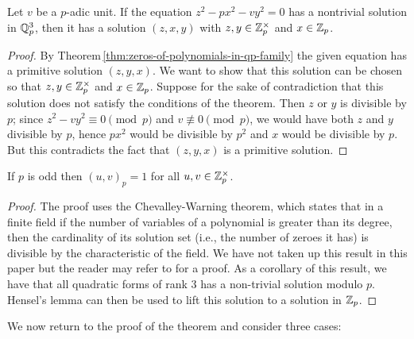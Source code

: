 \begin{lemmax}\label{lem:serre-sol-zp}
    {\normalfont\cite[p.~21]{serre2012course}} Let \(v\) be a \(p\)-adic unit.
    If the equation \(z^2 - px^2 - vy^2 = 0\) has a nontrivial solution in
    \(\mathbb{Q}_p^3\), then it has a solution \((z, x, y)\) with \(z, y \in
    \mathbb{Z}_p^{\times}\) and \(x \in \mathbb{Z}_p\).
\end{lemmax}

\begin{proof}
    By Theorem\,\ref{thm:zeros-of-polynomials-in-qp-family} the given equation
    has a primitive solution \((z, y, x)\). We want to show that this solution
    can be chosen so that \(z, y \in \mathbb{Z}_p^{\times}\) and \(x \in \mathbb{Z}_p\). Suppose
    for the sake of contradiction that this solution does not satisfy the
    conditions of the theorem. Then \(z\) or \(y\) is divisible by \(p\); since
    \(z^2 - vy^2 \equiv 0 \pmod{p}\) and \(v \not\equiv 0 \pmod{p}\), we would
    have both \(z\) and \(y\) divisible by \(p\), hence \(px^2\) would be
    divisible by \(p^2\) and \(x\) would be divisible by \(p\). But this
    contradicts the fact that \((z, y, x)\) is a primitive solution.
\end{proof}

\begin{lemmax}\label{lem:hilbert-odd-units}
    {\normalfont\cite[Lemma~10.5]{sutherland2013introduction10}} If \(p\) is odd
    then \((u, v)_p = 1\) for all \(u, v \in \mathbb{Z}_p^{\times}\).
\end{lemmax}

\begin{proof}
    The proof uses the Chevalley-Warning theorem, which states that in a finite
    field if the number of variables of a polynomial is greater than its degree,
    then the cardinality of its solution set (i.e., the number of zeroes it has)
    is divisible by the characteristic of the field. We have not taken up this
    result in this paper but the reader may refer to
    \cite[p.~5]{serre2012course} for a proof. As a corollary of this result, we
    have that all quadratic forms of rank \(3\) has a non-trivial solution
    modulo \(p\). Hensel's lemma can then be used to lift this solution to a
    solution in \(\mathbb{Z}_p\).
\end{proof}

\bigskip

We now return to the proof of the theorem and consider three cases:

\smallskip

